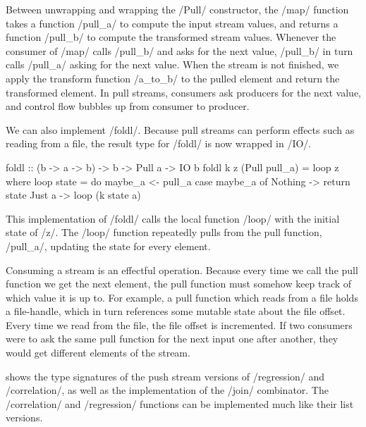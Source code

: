 Between unwrapping and wrapping the \Hs/Pull/ constructor, the \Hs/map/ function takes a function \Hs/pull_a/ to compute the input stream values, and returns a function \Hs/pull_b/ to compute the transformed stream values.
Whenever the consumer of \Hs/map/ calls \Hs/pull_b/ and asks for the next value, \Hs/pull_b/ in turn calls \Hs/pull_a/ asking for the next value.
When the stream is not finished, we apply the transform function \Hs/a_to_b/ to the pulled element and return the transformed element.
In pull streams, consumers ask producers for the next value, and control flow bubbles up from consumer to producer.

We can also implement \Hs/foldl/.
Because pull streams can perform effects such as reading from a file, the result type for \Hs/foldl/ is now wrapped in \Hs/IO/.

\begin{haskell}
foldl :: (b -> a -> b) -> b -> Pull a -> IO b
foldl k z (Pull pull_a) = loop z
 where
  loop state = do
    maybe_a <- pull_a
    case maybe_a of
      Nothing -> return state
      Just a -> loop (k state a)
\end{haskell}

This implementation of \Hs/foldl/ calls the local function \Hs/loop/ with the initial state of \Hs/z/.
The \Hs/loop/ function repeatedly pulls from the pull function, \Hs/pull_a/, updating the state for every element.

Consuming a stream is an effectful operation.
Because every time we call the pull function we get the next element, the pull function must somehow keep track of which value it is up to.
For example, a pull function which reads from a file holds a file-handle, which in turn references some mutable state about the file offset.
Every time we read from the file, the file offset is incremented.
If two consumers were to ask the same pull function for the next input one after another, they would get different elements of the stream.


 shows the type signatures of the push stream versions of \Hs/regression/ and \Hs/correlation/, as well as the implementation of the \Hs/join/ combinator.
The \Hs/correlation/ and \Hs/regression/ functions can be implemented much like their list versions.

